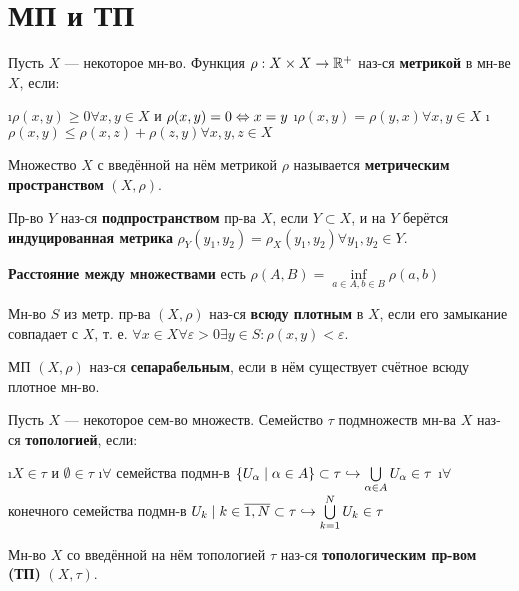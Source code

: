 

\usepackage{tikz}

\newcommand{\ra}{\rightarrow}
\newcommand{\cross}{\times}
\newcommand{\bf}{\textbf}
\newcommand{\eps}{\varepsilon}
\newcommand{\norm}[1]{\left\lVert#1\right\rVert}
\newcommand{\wave}{\tilde}



\section{МП и ТП}

\begin{defn}
Пусть $X$ --- некоторое мн-во. Функция $\rho:X \cross X \ra \R^+$ наз-ся \textbf{метрикой} в мн-ве $X$, если:
\begin{enumerate}
	\i $\rho(x, y) \ge 0 \forall x, y \in X$ и $\rho(x, y) = 0 \Leftrightarrow x=y$
	\i $\rho(x, y) = \rho(y, x) \forall x, y \in X$
	\i $\rho(x, y) \le \rho(x, z)+\rho(z, y) \forall x, y, z \in X$
\end{enumerate}
Множество $X$ с введённой на нём метрикой $\rho$ называется \bf{метрическим пространством} $(X, \rho)$.
\end{defn}

\begin{defn}
Пр-во $Y$ наз-ся \bf{подпространством} пр-ва $X$, если $Y \subset X$, и на $Y$ берётся \bf{индуцированная метрика} $\rho_Y(y_1, y_2) = \rho_X(y_1, y_2) \forall y_1, y_2 \in Y$. 
\end{defn}

\begin{defn}
\bf{Расстояние между множествами} есть $\rho(A, B) = \inf\limits_{a \in A, b \in B} \rho(a, b)$
\end{defn}

\begin{defn}
Мн-во $S$ из метр. пр-ва $(X, \rho)$ наз-ся \bf{всюду плотным} в $X$, если его замыкание совпадает с $X$, т. е. $\forall x \in X \forall \eps > 0 \exists y \in S: \rho(x, y)<\eps$.	
\end{defn}

\begin{defn}
МП $(X, \rho)$ наз-ся \bf{сепарабельным}, если в нём существует счётное всюду плотное мн-во. 
\end{defn}

\begin{defn}
Пусть $X$ --- некоторое сем-во множеств. Семейство $\tau$ подмножеств мн-ва $X$ наз-ся \bf{топологией}, если:
\begin{enumerate}
\i $X \in \tau$ и $\emptyset \in \tau$
\i $\forall$ семейства подмн-в $\{U_\alpha \mid \alpha \in A\} \subset \tau \hookrightarrow \bigcup\limits_{\alpha \in A} U_\alpha \in \tau$
\i $\forall$ конечного семейства подмн-в ${U_k \mid k \in \overline{1,N}} \subset \tau \hookrightarrow \bigcup\limits_{k=1}^N U_k \in \tau$
\end{enumerate}
Мн-во $X$ со введённой на нём топологией $\tau$ наз-ся \bf{топологическим пр-вом (ТП)} $(X, \tau)$.
\end{defn}


